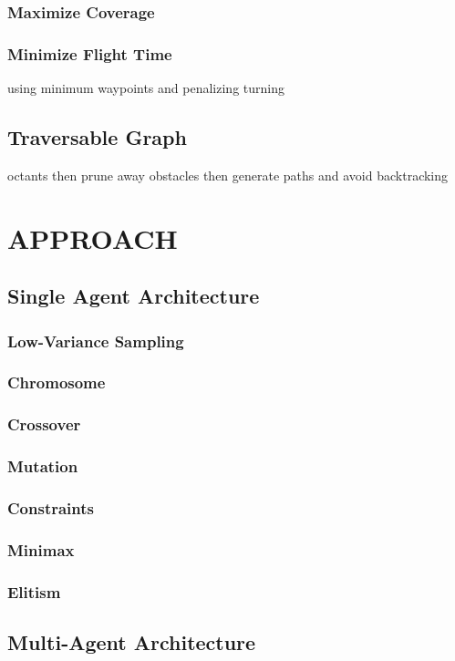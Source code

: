 \documentclass[letterpaper, 10 pt, conference]{ieeeconf}  %
\begin{document}
\subsubsection{Maximize Coverage}
\subsubsection{Minimize Flight Time}
using minimum waypoints and penalizing turning
\subsection{Traversable Graph}
octants then prune away obstacles then generate paths and avoid backtracking
\section{APPROACH}\label{approach}
\subsection{Single Agent Architecture}
\subsubsection{Low-Variance Sampling}
\subsubsection{Chromosome}
\subsubsection{Crossover}
\subsubsection{Mutation}
\subsubsection{Constraints}
\subsubsection{Minimax}
\subsubsection{Elitism}
\subsection{Multi-Agent Architecture}
\end{document}
